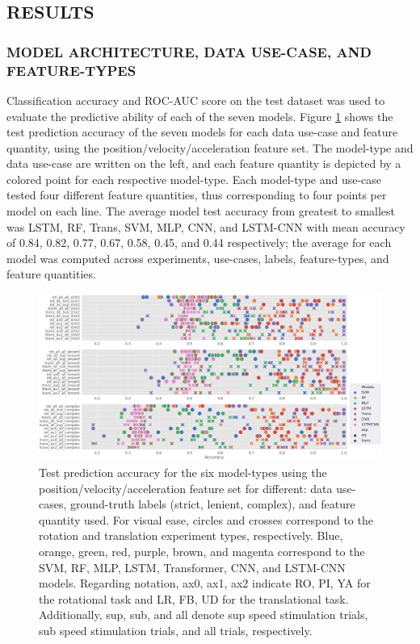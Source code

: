 \documentclass{ieeeaccess}
\begin{document}

\subsection{RESULTS}
\label{PART2_RESULTS}

\subsubsection{MODEL ARCHITECTURE, DATA USE-CASE, AND FEATURE-TYPES}
\label{PART2_RESULTS_MODEL_ARCHITECTURE_USECASE_FEATURE_TYPES}
Classification accuracy and ROC-AUC score on the test dataset was used to evaluate the predictive ability of each of the seven models. Figure \ref{fig6} shows the test prediction accuracy of the seven models for each data use-case and feature quantity, using the position/velocity/acceleration feature set. The model-type and data use-case are written on the left, and each feature quantity is depicted by a colored point for each respective model-type. Each model-type and use-case tested four different feature quantities, thus corresponding to four points per model on each line. The average model test accuracy from greatest to smallest was LSTM, RF, Trans, SVM, MLP, CNN, and LSTM-CNN with mean accuracy of 0.84, 0.82, 0.77, 0.67, 0.58, 0.45, and 0.44 respectively; the average for each model was computed across experiments, use-cases, labels, feature-types, and feature quantities.

\begin{figure}[htp]
\begin{center}
\includegraphics[width=1.0\linewidth]{figures/figure6_2.eps}
\end{center}
\caption{Test prediction accuracy for the six model-types using the position/velocity/acceleration feature set for different: data use-cases, ground-truth labels (strict, lenient, complex), and feature quantity used. For visual ease, circles and crosses correspond to the rotation and translation experiment types, respectively. Blue, orange, green, red, purple, brown, and magenta correspond to the SVM, RF, MLP, LSTM, Transformer, CNN, and LSTM-CNN models. Regarding notation, ax0, ax1, ax2 indicate RO, PI, YA for the rotational task and LR, FB, UD for the translational task. Additionally, sup, sub, and all denote sup speed stimulation trials, sub speed stimulation trials, and all trials,
respectively.}
\label{fig6}
\end{figure}
\end{document}
